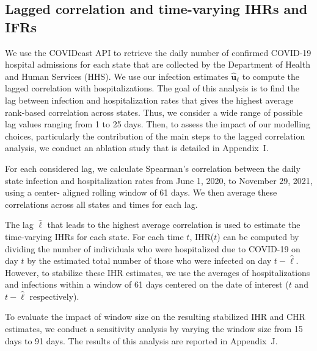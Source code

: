 \subsection{Lagged correlation and time-varying IHRs and IFRs} 
\label{sec:ihr-calculations}

We use the COVIDcast API \citep{reinhart2021open} to retrieve the daily number of
confirmed COVID-19 hospital admissions for each state that are collected by the
\US Department of Health and Human Services (HHS). We use our infection
estimates $\mathbf{\widehat{u}}_\ell$ to compute the lagged correlation with
hospitalizations. The goal of this analysis is to find the lag between infection
and hospitalization rates that gives the highest average rank-based correlation
across \US states. Thus, we consider a wide range of possible lag values ranging
from 1 to 25 days. Then, to assess the impact of our modelling choices,
particularly the contribution of the main steps to the lagged correlation
analysis, we conduct an ablation study that is detailed in Appendix~I.


For each considered lag, we calculate Spearman's correlation between the daily
state infection and hospitalization rates from June 1, 2020, to November 29,
2021, using a center- aligned rolling window of 61 days. We then average these
correlations across all states and times for each lag. 

The lag $\widehat\ell$ that leads to the highest average correlation is used to
estimate the time-varying IHRs for each state. For each time $t$, IHR($t$) can
be computed by dividing the number of individuals who were hospitalized due to
COVID-19 on day $t$ by the estimated total number of those who were infected on
day $t-\widehat{\ell}$. However, to stabilize these IHR estimates, we use the
averages of hospitalizations and infections within a window of 61 days centered
on the date of interest ($t$ and $t-\widehat{\ell}$ respectively).

To evaluate the impact of window size on the resulting stabilized IHR and CHR
estimates, we conduct a sensitivity analysis by varying the window size from 15
days to 91 days. The results of this analysis are reported in Appendix~J.

